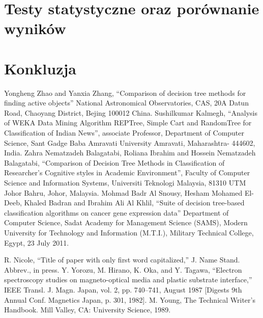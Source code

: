 \documentclass[conference]{IEEEtran}
\begin{document}
\section{Testy statystyczne oraz porównanie wyników}

\section{Konkluzja}

\begin{thebibliography}{00}
 Yongheng Zhao and Yanxia Zhang, ``Comparison of decision tree methods for finding active objects'' National Astronomical Observatories, CAS, 20A Datun Road, Chaoyang District, Bejing 100012 China.
 Sushilkumar Kalmegh, ``Analysis of WEKA Data Mining Algorithm REPTree, Simple Cart and RandomTree for Classification of Indian News'', associate Professor, Department of Computer Science, Sant Gadge Baba Amravati University
Amravati, Maharashtra- 444602, India.
 Zahra Nematzadeh Balagatabi, Roliana Ibrahim and Hossein Nematzadeh Balagatabi, ``Comparison of Decision Tree Methods in Classification of Researcher’s Cognitive styles in Academic Environment'', Faculty of Computer Science and Information Systems, Universiti Teknologi Malaysia, 81310 UTM Johor Bahru, Johor, Malaysia.
 Mohmad Badr Al Snousy, Hesham Mohamed El-Deeb, Khaled Badran and Ibrahim Ali Al Khlil, ``Suite of decision tree-based classification algorithms on cancer gene expression data'' Department of Computer Science, Sadat Academy for Management Science (SAMS), Modern University for Technology and Information (M.T.I.),  Military Technical College, Egypt, 23 July 2011.

 R. Nicole, ``Title of paper with only first word capitalized,'' J. Name Stand. Abbrev., in press.
 Y. Yorozu, M. Hirano, K. Oka, and Y. Tagawa, ``Electron spectroscopy studies on magneto-optical media and plastic substrate interface,'' IEEE Transl. J. Magn. Japan, vol. 2, pp. 740--741, August 1987 [Digests 9th Annual Conf. Magnetics Japan, p. 301, 1982].
 M. Young, The Technical Writer's Handbook. Mill Valley, CA: University Science, 1989.
\end{thebibliography}
\end{document}
